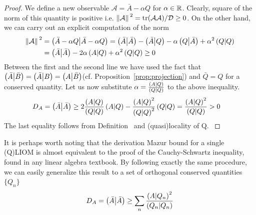 \begin{proof}
  We define a new observable \(\mathcal{A} = \bar{A} - \alpha Q\) for \(\alpha \in \mathbb{R}\).
  Clearly, square of the norm of this quantity is positive i.e. \(\norm*{\mathcal{A}}^2 = 
  \tr(\mathcal{A}\mathcal{A})/\mathcal{D} \geq 0\). On the other hand, we can carry out an
  explicit computation of the norm
  \begin{align*}
  \norm*{\mathcal{A}}^2 &= \left(\bar{A}-\alpha Q \middle| \bar{A}-\alpha Q\right) = \left(\bar{A} \middle| \bar{A}\right) - 
  \left(\bar{A} \middle| Q\right) - \alpha \left(Q \middle| \bar{A}\right) + \alpha^2 \left(Q \middle| Q\right) \\
  &= \left(\bar{A} \middle| \bar{A}\right) - 2\alpha \left(A \middle| Q\right) + \alpha^2 \left(Q \middle| Q\right) \geq 0
  \end{align*}
  Between the first and the second line we have used the fact that \(\left(\bar{A} \middle| \bar{B}\right) = 
  \left(\bar{A} \middle| B\right) = \left(A \middle| \bar{B}\right)\)(cf. Proposition~\ref{prop:projection}) and \(\bar{Q} = Q\) 
  for a conserved quantity. Let us now substitute \(\alpha = \frac{\left(A \middle| Q\right)}{\left(Q \middle| Q\right)}\) to the
  above inequality.
  \begin{align*}
    D_A = \left(\bar{A} \middle| \bar{A}\right) &\geq 2 \frac{\left(A \middle| Q\right)}{\left(Q \middle| Q\right)} \left(A \middle| Q\right) - \frac{\left(A \middle| Q\right)^2}{\left(Q \middle| Q\right)^2}\left(Q \middle| Q\right)
    = \frac{\left(A \middle| Q\right)^2}{\left(Q \middle| Q\right)} > 0
  \end{align*}
  The last equality follows from Definition~ and (quasi)locality of Q.
  \label{proof:single mazur}  
\end{proof}
It is perhaps worth noting that the derivation Mazur bound for a single (Q)LIOM is almost equivalent to the proof of
the Cauchy-Schwartz inequality, found in any linear algebra textbook. By following exactly the same procedure, 
we can easily generalize this result to a set of orthogonal conserved quantities \(\{Q_{n}\}\)
\begin{equation}
  D_A = \left(\bar{A} \middle| \bar{A}\right) \geq \sum_{n} \frac{\left(A \middle| Q_n\right)^2}{\left(Q_n \middle| Q_n\right)}
\end{equation}

